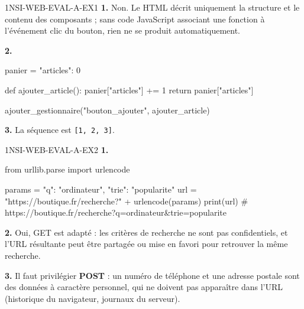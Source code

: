 \begin{corrige}{1NSI-WEB-EVAL-A-EX1}
\textbf{1.} Non. Le HTML décrit uniquement la structure et le contenu des composants ; sans code
JavaScript associant une fonction à l'événement clic du bouton, rien ne se produit
automatiquement.

\textbf{2.}
\begin{python}
panier = {"articles": 0}

def ajouter_article():
    panier["articles"] += 1
    return panier["articles"]

ajouter_gestionnaire("bouton_ajouter", ajouter_article)
\end{python}

\textbf{3.} La séquence est \lstinline{[1, 2, 3]}.
\end{corrige}

\begin{corrige}{1NSI-WEB-EVAL-A-EX2}
\textbf{1.}
\begin{python}
from urllib.parse import urlencode

params = {"q": "ordinateur", "trie": "popularite"}
url = "https://boutique.fr/recherche?" + urlencode(params)
print(url)
# https://boutique.fr/recherche?q=ordinateur&trie=popularite
\end{python}

\textbf{2.} Oui, GET est adapté : les critères de recherche ne sont pas confidentiels, et
l'URL résultante peut être partagée ou mise en favori pour retrouver la même recherche.

\textbf{3.} Il faut privilégier \textbf{POST} : un numéro de téléphone et une adresse
postale sont des données à caractère personnel, qui ne doivent pas apparaître dans l'URL
(historique du navigateur, journaux du serveur).
\end{corrige}
